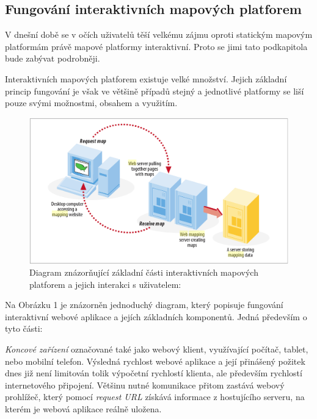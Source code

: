 \newpage
\subsection{Fungování interaktivních mapových platforem}
\label{sssec:fungovani-platforem}

V dnešní době se v očích uživatelů těší velkému zájmu oproti statickým mapovým platformám právě mapové platformy interaktivní. Proto se jimi tato podkapitola bude
zabývat podrobněji.

Interaktivních mapových platforem existuje velké množství. Jejich
základní princip fungování je však ve většině případů stejný a jednotlivé 
platformy se liší pouze svými možnostmi, obsahem a využitím.

\begin{figure}[h!]
	\centering
	\includegraphics[width=1\textwidth]{../img/map-web-diagram.png}
	\caption{Diagram znázorňující základní části interaktivních mapových platforem a jejich interakci s uživatelem: \cite{web_mapping}}
	\label{fig:WPS_class_diagram}
\end{figure}

Na Obrázku 1 je znázorněn jednoduchý diagram, který popisuje fungování
interaktivní webové aplikace a jejích základních komponentů. Jedná především o tyto části:

\textit{Koncové zařízení} označované také jako webový klient,
využívající počítač, tablet, nebo mobilní telefon. Výsledná rychlost webové aplikace a její přinášený požitek dnes již není limitován tolik výpočetní
rychlostí klienta, ale především rychlostí internetového
připojení. Většinu nutné komunikace přitom zastává webový prohlížeč,
který pomocí \textit{request URL} získává informace z hostujícího
serveru, na kterém je webová aplikace reálně uložena.

